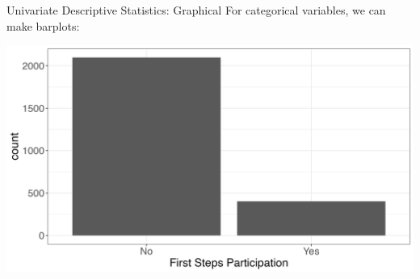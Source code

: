 \documentclass[10pt,t]{beamer}
\begin{document}
\begin{frame}{Univariate Descriptive Statistics: Graphical}
For categorical variables, we can make barplots:

\vspace{0.3cm}

\centering \includegraphics[scale=0.4]{fs_bar.png}

\end{frame}
\end{document}

